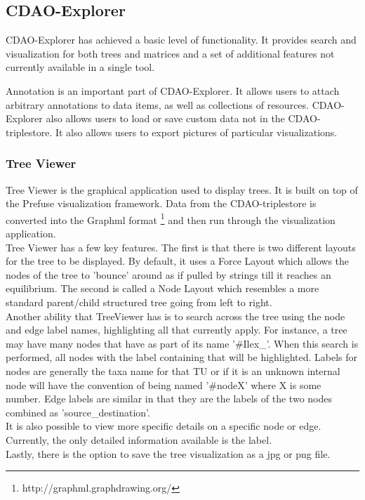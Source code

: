 \documentclass[10pt]{bmc_article}
\newenvironment{bmcformat}{\begin{raggedright}\baselineskip20pt\sloppy\setboolean{publ}{false}}{\end{raggedright}\baselineskip20pt\sloppy}
\begin{document}
\begin{bmcformat}
  
  \subsection*{CDAO-Explorer}
  CDAO-Explorer has achieved a basic level of functionality. It provides search and visualization for both
  trees and matrices and a set of additional features not currently available in a single tool. 
  
  Annotation is an important part of CDAO-Explorer. It allows users to attach arbitrary annotations to data items,
  as well as collections of resources.  CDAO-Explorer also allows users to load or save custom data not in the CDAO-triplestore. It also allows users to export
  pictures of particular visualizations. 

\subsubsection*{Tree Viewer}
Tree Viewer is the graphical application used to display trees.  It is built on top of the Prefuse visualization framework. Data from the CDAO-triplestore is converted into the Graphml format \footnote{http://graphml.graphdrawing.org/} and then run through the visualization application.
\\
Tree Viewer has a few key features.  The first is that there is two different layouts for the tree to be displayed.  By default, it uses a Force Layout which allows the nodes of the tree to 'bounce' around as if pulled by strings till it reaches an equilibrium.  The second is called a Node Layout which resembles a more standard parent/child structured tree going from left to right.
\\
Another ability that TreeViewer has is to search across the tree using the node and edge label names, highlighting all that currently apply.  For instance, a tree may have many nodes that have as part of its name '\#Ilex\_'.  When this search is performed, all nodes with the label containing that will be highlighted.  Labels for nodes are generally the taxa name for that TU or if it is an unknown internal node will have the convention of being named '\#nodeX' where X is some number.  Edge labels are similar in that they are the labels of the two nodes combined as 'source\_destination'.
\\
It is also possible to view more specific details on a specific node or edge.  Currently, the only detailed information available is the label.  \\
Lastly, there is the option to save the tree visualization as a jpg or png file.

\end{bmcformat}
\end{document}
